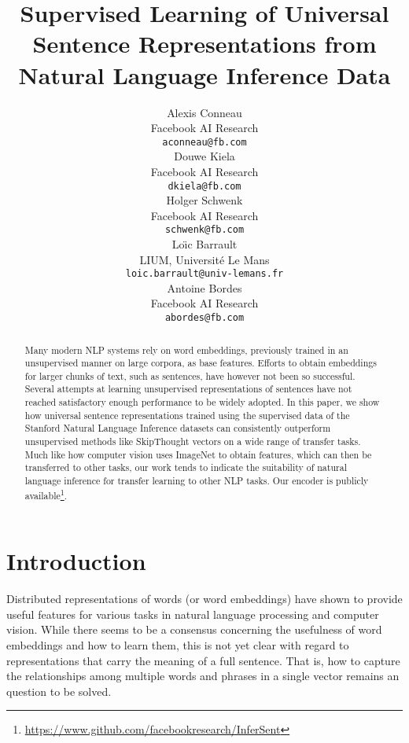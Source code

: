 \documentclass[11pt,letterpaper]{article}
\title{Supervised Learning of Universal Sentence Representations from\\ Natural Language Inference Data}
\author{
Alexis Conneau \\
Facebook AI Research \\
\texttt{aconneau@fb.com} \\
\And
Douwe Kiela \\
Facebook AI Research \\
\texttt{dkiela@fb.com} \\
\And
Holger Schwenk \\
Facebook AI Research \\
\texttt{schwenk@fb.com} \\
\AND
Lo\"{\i}c Barrault \\
LIUM, Universit\'e Le Mans \\
\texttt{loic.barrault@univ-lemans.fr} \\
\And
Antoine Bordes \\
Facebook AI Research \\
\texttt{abordes@fb.com} \\
}
\date{}
\begin{document}
\maketitle

\begin{abstract}
Many modern NLP systems rely on word embeddings, previously trained in an unsupervised manner on large corpora, as base features.
Efforts to obtain embeddings for larger chunks of text, such as sentences, have however not been so successful.
Several attempts at learning unsupervised representations of sentences have not reached satisfactory enough performance to be widely adopted.
In this paper, we show how universal sentence representations trained using the supervised data of the Stanford Natural Language Inference datasets can consistently outperform unsupervised methods like SkipThought vectors \cite{kiros2015skip} on a wide range of transfer tasks. Much like how computer vision uses ImageNet to obtain features, which can then be transferred to other tasks, our work tends to indicate the suitability of natural language inference for transfer learning to other NLP tasks. Our encoder is publicly available\footnote{\url{https://www.github.com/facebookresearch/InferSent}}.


\end{abstract}

\section{Introduction}

Distributed representations of words (or word embeddings) \cite{bengio2003neural, collobert2011natural, mikolov2013distributed, pennington2014glove} have shown to provide useful features for various tasks in natural language processing and computer vision. 
While there seems to be a consensus concerning the usefulness of word embeddings and how to learn them, this is not yet clear with regard to representations that carry the meaning of a full sentence. That is, how to capture the relationships among multiple words and phrases in a single vector remains an question to be solved.
\end{document}
